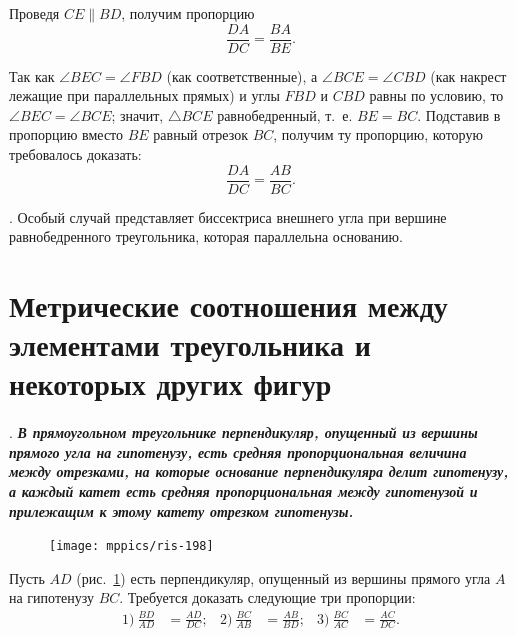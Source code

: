 \documentclass[oneside]{book}
\begin{document}
Проведя $CE \parallel BD$, получим пропорцию
\[\frac{DA}{DC}=\frac{BA}{BE}.\]

Так как $\angle BEC=\angle FBD$ (как соответственные), а $\angle BCE=\angle CBD$ (как накрест лежащие при параллельных прямых) и углы $FBD$ и $CBD$ равны по условию, то $\angle BEC=\angle BCE$;
значит, $\triangle BCE$ равнобедренный, т.~е. $BE=BC$.
Подставив в пропорцию вместо $BE$ равный отрезок $BC$, получим ту пропорцию, которую требовалось доказать:
\[\frac{DA}{DC}=\frac{AB}{BC}.\]

.
Особый случай представляет биссектриса внешнего угла при вершине равнобедренного треугольника, которая параллельна основанию.


\section{Метрические соотношения между элементами треугольника и некоторых других фигур}

\paragraph{}\label{1938/188}
.
\textbf{\emph{В прямоугольном треугольнике перпендикуляр, опущенный из вершины прямого угла на гипотенузу, есть средняя пропорциональная величина между отрезками, на которые основание перпендикуляра делит гипотенузу, а каждый катет есть средняя пропорциональная между гипотенузой и прилежащим к этому катету отрезком гипотенузы.}}

\begin{figure}
\centering
\texttt{[image: mppics/ris-198]}
\caption{}\label{1938/ris-198}
\end{figure}

Пусть $AD$ (рис.~\ref{1938/ris-198}) есть перпендикуляр, опущенный из вершины прямого угла $A$ на гипотенузу $BC$.
Требуется доказать следующие три пропорции:
\begin{align*}
1)\ \frac{BD}{AD}&=\frac{AD}{DC};
&
2)\ \frac{BC}{AB}&=\frac{AB}{BD};
&
3)\ \frac{BC}{AC}&=\frac{AC}{DC}.
\end{align*}
\end{document}
